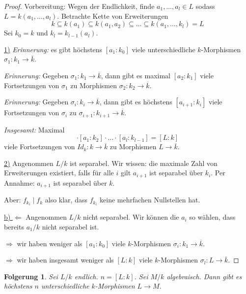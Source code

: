 \documentclass[a4paper,12pt,numbers=noenddot,parskip=full]{scrartcl}
\newcommand{\heading}{\underline}
\theoremstyle{dotless}
\newtheorem{corollary}[theorem]{Folgerung}
\theoremstyle{remark}
\begin{document}
	\begin{proof}
		Vorbereitung: Wegen der Endlichkeit, finde $a_1, \dots, a_l \in L$ sodass $L = k(a_1, \dots, a_l)$. Betrachte Kette von Erweiterungen
		\begin{equation*}
			k \subseteq k(a_1) \subseteq k(a_1, a_2) \subseteq \dots \subseteq k(a_1, \dots, k_l) = L
		\end{equation*}
		Sei $k_0 = k$ und $k_l = k_{l-1}(a_l)$.
		
		\heading{1)} \textit{Erinnerung:} es gibt höchstens $[a_1: k_0]$ viele unterschiedliche $k$-Morphismen $\sigma_1: k_1 \to \overline{k}$.
		
		\textit{Erinnerung:} Gegeben $\sigma_1: k_1 \to \overline{k}$, dann gibt es maximal $[a_2 : k_1]$ viele Fortsetzungen von $\sigma_1$ zu Morphismen $\sigma_2: k_2 \to \overline{k}$.
		
		\textit{Erinnerung:} Gegeben $\sigma_i: k_i \to \overline{k}$, dann gibt es höchstens $[a_{i+1}: k_i]$ viele Fortsetzungen von $\sigma_i$ zu $\sigma_{i+1}: k_{i+1} \to \overline{k}$.
		
		\textit{Insgesamt:} Maximal
		\begin{equation*}
			[a_1: k_0] \cdot [a_1: k_2] \cdot \dots \cdot [a_l: k_{l-1}] = [L:k]
		\end{equation*}
		viele Fortsetzungen von $Id_k: k \to \overline{k}$ zu Morphismen $L \to \overline{k}$.
		
		\heading{2)} Angenommen $L/k$ ist separabel. Wir wissen: die maximale Zahl von Erweiterungen existiert, falls für alle $i$ gilt $a_{i+1}$ ist separabel über $k_i$. Per Annahme: $a_{i+1}$ ist separabel über $k$.
		
		Aber: $f_{k_i} \mid f_k$ also klar, dass $f_{k_i}$ keine mehrfachen Nullstellen hat.
		
		\heading{b) $\Leftarrow$} Angenommen $L/k$ nicht separabel. Wir können die $a_i$ so wählen, dass bereits $a_1/k$ nicht separabel ist.
		
		$\Rightarrow$ wir haben weniger als $[a_1: k_0]$ viele $k$-Morphismen $\sigma_i: k_1 \to \overline{k}$.
		
		$\Rightarrow$ wir haben insgesamt weniger als $[L:k]$ viele $k$-Morphismen $\sigma_l: L \to \overline{k}$.
	\end{proof}

	\begin{corollary}
		Sei $L/k$ endlich. $n = [L:k]$. Sei $M/k$ algebraisch. Dann gibt es höchstens $n$ unterschiedliche $k$-Morphismen $L \to M$.
	\end{corollary}
\end{document}
